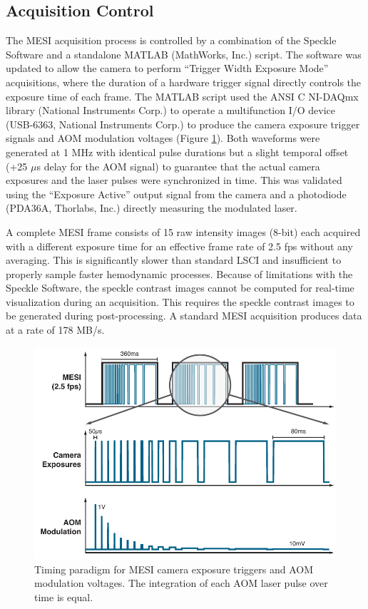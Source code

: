 \subsection{Acquisition Control}

The MESI acquisition process is controlled by a combination of the Speckle Software and a standalone MATLAB (MathWorks, Inc.) script. The software was updated to allow the camera to perform ``Trigger Width Exposure Mode'' acquisitions, where the duration of a hardware trigger signal directly controls the exposure time of each frame. The MATLAB script used the ANSI C NI-DAQmx library (National Instruments Corp.) to operate a multifunction I/O device (USB-6363, National Instruments Corp.) to produce the camera exposure trigger signals and AOM modulation voltages (Figure \ref{fig:mesitimingschematic}). Both waveforms were generated at 1 MHz with identical pulse durations but a slight temporal offset (+25 $\mu$s delay for the AOM signal) to guarantee that the actual camera exposures and the laser pulses were synchronized in time. This was validated using the ``Exposure Active'' output signal from the camera and a photodiode (PDA36A, Thorlabs, Inc.) directly measuring the modulated laser.

A complete MESI frame consists of 15 raw intensity images (8-bit) each acquired with a different exposure time for an effective frame rate of 2.5 fps without any averaging. This is significantly slower than standard LSCI and insufficient to properly sample faster hemodynamic processes. Because of limitations with the Speckle Software, the speckle contrast images cannot be computed for real-time visualization during an acquisition. This requires the speckle contrast images to be generated during post-processing. A standard MESI acquisition produces data at a rate of 178 MB/s.

\begin{figure}
    \includegraphics{figures/chapter_4/mesitimingschematic.pdf}
    \caption{
        \label{fig:mesitimingschematic}
        Timing paradigm for MESI camera exposure triggers and AOM modulation voltages. The integration of each AOM laser pulse over time is equal.
    }
\end{figure}

